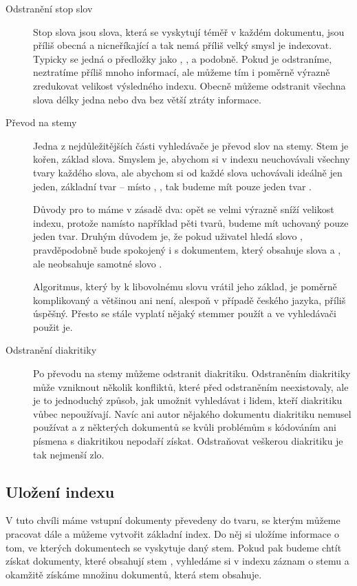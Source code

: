 \documentclass[12pt]{article}
\begin{document}
\begin{description}
\item[Odstranění stop slov] Stop slova jsou slova, která se vyskytují téměř v každém dokumentu, jsou příliš obecná a nicneříkající a tak nemá příliš velký smysl je indexovat. Typicky se jedná o předložky jako , ,  a podobně. Pokud je odstraníme, neztratíme příliš mnoho informací, ale můžeme tím i poměrně výrazně zredukovat velikost výsledného indexu. Obecně můžeme odstranit všechna slova délky jedna nebo dva bez větší ztráty informace. 

\item[Převod na stemy] Jedna z nejdůležitějších části vyhledávače je převod slov na stemy. Stem je kořen, základ slova. Smyslem je, abychom si v indexu neuchovávali všechny tvary každého slova, ale abychom si od každé slova uchovávali ideálně jen jeden, základní tvar -- místo , ,  tak budeme mít pouze jeden tvar .

Důvody pro to máme v zásadě dva: opět se velmi výrazně sníží velikost indexu, protože namísto například pěti tvarů, budeme mít uchovaný pouze jeden tvar. Druhým důvodem je, že pokud uživatel hledá slovo , pravděpodobně bude spokojený i s dokumentem, který obsahuje slova  a , ale neobsahuje samotné slovo . 

Algoritmus, který by k libovolnému slovu vrátil jeho základ, je poměrně komplikovaný a většinou ani není, alespoň v případě českého jazyka, příliš úspěšný. Přesto se stále vyplatí nějaký stemmer použít a ve vyhledávači použit je. 

\item[Odstranění diakritiky] Po převodu na stemy můžeme odstranit diakritiku. Odstraněním diakritiky může vzniknout několik konfliktů, které před odstraněním neexistovaly, ale je to jednoduchý způsob, jak umožnit vyhledávat i lidem, kteří diakritiku vůbec nepoužívají. Navíc ani autor nějakého dokumentu diakritiku nemusel používat a z některých dokumentů se kvůli problémům s kódováním ani písmena s diakritikou nepodaří získat. Odstraňovat veškerou diakritiku je tak nejmenší zlo. 
\end{description} 

\subsection{Uložení indexu}
V tuto chvíli máme vstupní dokumenty převedeny do tvaru, se kterým můžeme pracovat dále a můžeme vytvořit základní index. Do něj si uložíme informace o tom, ve kterých dokumentech se vyskytuje daný stem. Pokud pak budeme chtít získat dokumenty, které obsahují stem , vyhledáme si v indexu záznam o stemu  a okamžitě získáme množinu dokumentů, která stem obsahuje. 
\end{document}
